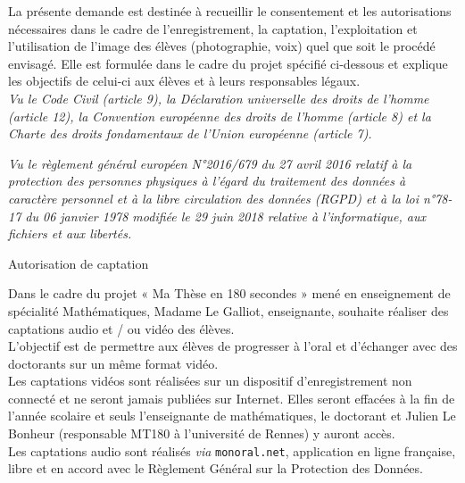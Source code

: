 \documentclass[10pt, a4paper,article]{nsi}
\begin{document}

\scriptsize
La présente demande est destinée à recueillir le consentement et les autorisations nécessaires dans le cadre de l'enregistrement, la captation, l'exploitation et l'utilisation de l'image des élèves (photographie, voix) quel que soit le procédé envisagé. Elle est formulée dans le cadre du projet spécifié ci-dessous et explique les objectifs de celui-ci aux élèves et à leurs responsables légaux.\\

\textit{Vu le Code Civil (article 9), la Déclaration universelle des droits de l'homme (article 12), la Convention européenne des droits de l'homme (article 8) et la Charte des droits fondamentaux de l'Union européenne (article 7).}

\textit{Vu le règlement général européen N°2016/679 du 27 avril 2016 relatif à la protection des personnes physiques à l'égard du traitement des données à caractère personnel et à la libre circulation des données (RGPD) et à la loi n°78-17 du 06 janvier 1978 modifiée le 29 juin 2018 relative à l'informatique, aux fichiers et aux libertés.}\\

\normalsize

\begin{center}
    \Large\color{UGLiBlue}\titlefont Autorisation de captation
\end{center}

Dans le cadre du projet « Ma Thèse en 180 secondes » mené en enseignement de spécialité Mathématiques, Madame Le Galliot, enseignante, souhaite réaliser des captations audio et / ou vidéo des élèves. \\
L'objectif est de permettre aux élèves de progresser à l'oral et d'échanger avec des doctorants sur un même format vidéo.\\


Les captations vidéos sont réalisées sur un dispositif d'enregistrement non connecté et ne seront jamais publiées sur Internet. Elles seront effacées à la fin de l'année scolaire et seuls l'enseignante de mathématiques, le doctorant et Julien Le Bonheur (responsable MT180 à l'université de Rennes) y auront accès.\\
Les captations audio sont réalisés \textit{via} \texttt{monoral.net}, application en ligne française, libre et en accord avec le Règlement Général sur la Protection des Données.
\end{document}
